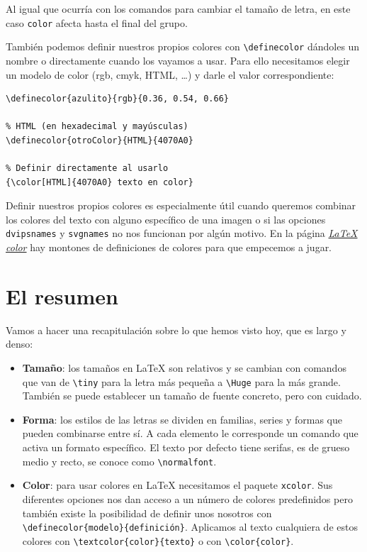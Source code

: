 Al igual que ocurría con los comandos para cambiar el tamaño de letra,
en este caso \lstinline!color! afecta hasta el final del grupo.

También podemos definir nuestros propios colores con
\lstinline!\definecolor! dándoles un nombre o directamente cuando los
vayamos a usar. Para ello necesitamos elegir un modelo de color (rgb,
cmyk, HTML, \ldots{}) y darle el valor correspondiente:

\begin{lstlisting}[language={[latex]tex}]
% RGB
\definecolor{azulito}{rgb}{0.36, 0.54, 0.66}

% HTML (en hexadecimal y mayúsculas)
\definecolor{otroColor}{HTML}{4070A0}

% Definir directamente al usarlo
{\color[HTML]{4070A0} texto en color}
\end{lstlisting}

Definir nuestros propios colores es especialmente útil cuando queremos
combinar los colores del texto con alguno específico de una imagen o si
las opciones \lstinline!dvipsnames! y \lstinline!svgnames! no nos
funcionan por algún motivo. En la página
\href{http://latexcolor.com/}{\emph{LaTeX color}} hay montones de
definiciones de colores para que empecemos a jugar.

\section{El resumen}\label{sec:resumen7}

Vamos a hacer una recapitulación sobre lo que hemos visto hoy, que es
largo y denso:

\begin{itemize}
\item
  \textbf{Tamaño}: los tamaños en LaTeX son relativos y se cambian con
  comandos que van de \lstinline!\tiny! para la letra más pequeña a
  \lstinline!\Huge! para la más grande. También se puede establecer un
  tamaño de fuente concreto, pero con cuidado.
\item
  \textbf{Forma}: los estilos de las letras se dividen en familias,
  series y formas que pueden combinarse entre sí. A cada elemento le
  corresponde un comando que activa un formato específico. El texto por
  defecto tiene serifas, es de grueso medio y recto, se conoce como
  \lstinline!\normalfont!.
\item
  \textbf{Color}: para usar colores en LaTeX necesitamos el paquete
  \lstinline!xcolor!. Sus diferentes opciones nos dan acceso a un número
  de colores predefinidos pero también existe la posibilidad de definir
  unos nosotros con \lstinline!\definecolor{modelo}{definición}!.
  Aplicamos al texto cualquiera de estos colores con
  \lstinline!\textcolor{color}{texto}! o con \lstinline!\color{color}!.
\end{itemize}

